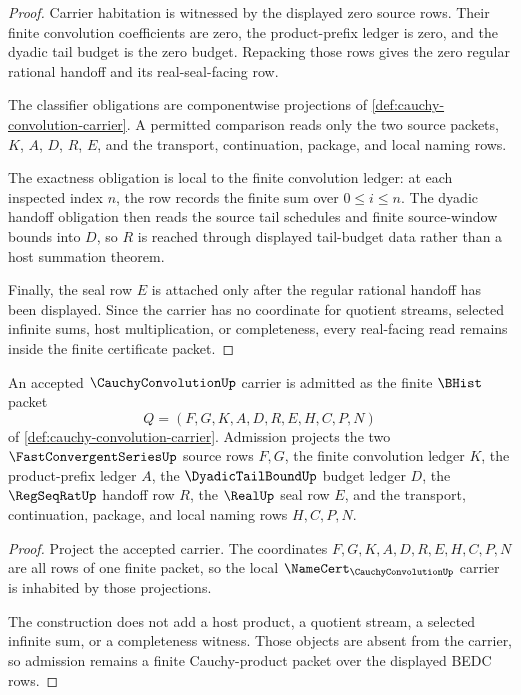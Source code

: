 \begin{proof}
Carrier habitation is witnessed by the displayed zero source rows. Their finite convolution coefficients are zero, the product-prefix ledger is zero, and the dyadic tail budget is the zero budget. Repacking those rows gives the zero regular rational handoff and its real-seal-facing row.

The classifier obligations are componentwise projections of \autoref{def:cauchy-convolution-carrier}. A permitted comparison reads only the two source packets, $K$, $A$, $D$, $R$, $E$, and the transport, continuation, package, and local naming rows.

The exactness obligation is local to the finite convolution ledger: at each inspected index $n$, the row records the finite sum over $0 \leq i \leq n$. The dyadic handoff obligation then reads the source tail schedules and finite source-window bounds into $D$, so $R$ is reached through displayed tail-budget data rather than a host summation theorem.

Finally, the seal row $E$ is attached only after the regular rational handoff has been displayed. Since the carrier has no coordinate for quotient streams, selected infinite sums, host multiplication, or completeness, every real-facing read remains inside the finite certificate packet.
\end{proof}

\begin{theorem}
\label{thm:cauchy-convolution-carrier-admission}
An accepted $\CauchyConvolutionUp$ carrier is admitted as the finite $\BHist$ packet
$$
Q=(F,G,K,A,D,R,E,H,C,P,N)
$$
of \autoref{def:cauchy-convolution-carrier}. Admission projects the two $\FastConvergentSeriesUp$ source rows $F,G$, the finite convolution ledger $K$, the product-prefix ledger $A$, the $\DyadicTailBoundUp$ budget ledger $D$, the $\RegSeqRatUp$ handoff row $R$, the $\RealUp$ seal row $E$, and the transport, continuation, package, and local naming rows $H,C,P,N$.
\end{theorem}
\begin{proof}
Project the accepted carrier. The coordinates $F,G,K,A,D,R,E,H,C,P,N$ are all rows of one finite packet, so the local $\NameCert_{\CauchyConvolutionUp}$ carrier is inhabited by those projections.

The construction does not add a host product, a quotient stream, a selected infinite sum, or a completeness witness. Those objects are absent from the carrier, so admission remains a finite Cauchy-product packet over the displayed BEDC rows.
\end{proof}

